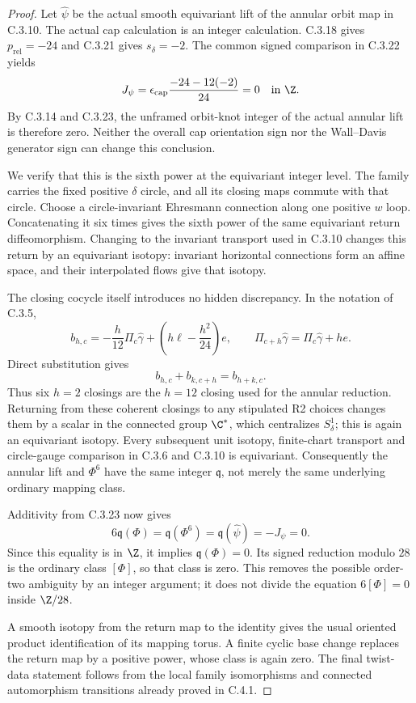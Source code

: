 \begin{proof}
Let $\widehat\psi$ be the actual smooth equivariant lift of
the annular orbit map in C.3.10.
The actual cap calculation is an integer calculation.
C.3.18 gives $p_{\mathrm{rel}}=-24$ and C.3.21 gives
$s_\delta=-2$. The common signed comparison in C.3.22 yields
\[
 J_\psi=\epsilon_{\rm cap}
          \frac{-24-12(-2)}{24}=0\quad\hbox{in }\Z.
\]
By C.3.14 and C.3.23, the unframed orbit-knot integer of the
actual annular lift is therefore zero. Neither the overall cap
orientation sign nor the Wall--Davis generator sign can change
this conclusion.

We verify that this is the sixth power at the equivariant
integer level. The family carries the fixed positive
$\delta$ circle, and all its closing maps commute with that
circle. Choose a circle-invariant Ehresmann connection along
one positive $w$ loop. Concatenating it six times gives the
sixth power of the same equivariant return diffeomorphism.
Changing to the invariant transport used in C.3.10 changes
this return by an equivariant isotopy: invariant horizontal
connections form an affine space, and their interpolated
flows give that isotopy.

The closing cocycle itself introduces no hidden discrepancy.
In the notation of C.3.5,
\[
 b_{h,c}=-\frac{h}{12}\Pi_c\widehat\gamma
             +\left(h\ell-\frac{h^2}{24}\right)e,
 \qquad \Pi_{c+h}\widehat\gamma
                   =\Pi_c\widehat\gamma+h e.
\]
Direct substitution gives
\[
 b_{h,c}+b_{k,c+h}=b_{h+k,c}.
\]
Thus six $h=2$ closings are the $h=12$ closing used for the
annular reduction. Returning from these coherent closings to
any stipulated R2 choices changes them by a scalar in the
connected group $\C^*$, which centralizes $S^1_\delta$;
this is again an equivariant isotopy. Every subsequent unit isotopy, finite-chart
transport and circle-gauge comparison in C.3.6 and C.3.10 is
equivariant. Consequently the annular lift and $\Phi^6$ have
the same integer $\mathfrak q$, not merely the same underlying
ordinary mapping class.

Additivity from C.3.23 now gives
\[
 6\mathfrak q(\Phi)=\mathfrak q(\Phi^6)
                   =\mathfrak q(\widehat\psi)=-J_\psi=0.
\]
Since this equality is in $\Z$, it implies
$\mathfrak q(\Phi)=0$. Its signed reduction modulo $28$
is the ordinary class $[\Phi]$, so that class is zero.
This removes the possible order-two ambiguity by an integer
argument; it does not divide the equation $6[\Phi]=0$ inside
$\Z/28$.

A smooth isotopy from the return map to the identity gives
the usual oriented product identification of its mapping
torus. A finite cyclic base change replaces the return map
by a positive power, whose class is again zero. The final
twist-data statement follows from the local family isomorphisms
and connected automorphism transitions already proved in C.4.1.
\end{proof}
